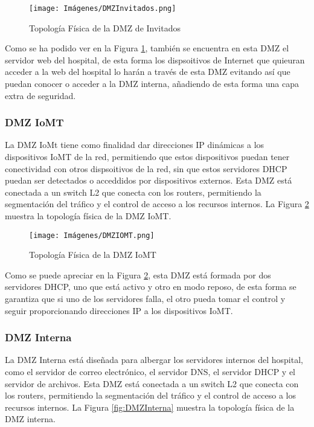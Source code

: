 \begin{figure}[H]
    \centering
    \texttt{[image: Imágenes/DMZInvitados.png]}
    \caption{Topología Física de la DMZ de Invitados}
    \label{fig:DMZInvitados}
\end{figure}

Como se ha podido ver en la Figura \ref{fig:DMZInvitados}, también se encuentra en esta DMZ el servidor web del hospital, de esta forma los dispsoitivos de Internet que quieuran acceder
a la web del hospital lo harán a través de esta DMZ evitando así que puedan conocer o acceder a la DMZ interna, añadiendo de esta forma una capa extra de seguridad.

\subsubsection{DMZ IoMT}
La DMZ IoMt tiene como finalidad dar direcciones IP dinámicas a los dispositivos IoMT de la red, permitiendo que estos dispositivos puedan tener conectividad con otros dispsoitivos de la red, sin 
que estos servidores DHCP puedan ser detectados o acceddidos por dispositivos externos. Esta DMZ está conectada a un switch L2 que conecta con los routers, permitiendo la segmentación del tráfico 
y el control de acceso a los recursos internos. La Figura \ref{fig:DMZIOMT} muestra la topología física de la DMZ IoMT.

\begin{figure}[H]
    \centering
    \texttt{[image: Imágenes/DMZIOMT.png]}
    \caption{Topología Física de la DMZ IoMT}
    \label{fig:DMZIOMT}
\end{figure}

Como se puede apreciar en la Figura \ref{fig:DMZIOMT}, esta DMZ está formada por dos servidores DHCP, uno que está activo y otro en modo reposo, de esta forma se garantiza que si uno de 
los servidores falla, el otro pueda tomar el control y seguir proporcionando direcciones IP a los dispositivos IoMT.

\subsubsection{DMZ Interna}
La DMZ Interna está diseñada para albergar los servidores internos del hospital, como el servidor de correo electrónico, el servidor DNS, el servidor DHCP y el servidor de archivos.
Esta DMZ está conectada a un switch L2 que conecta con los routers, permitiendo la segmentación del tráfico y el control de acceso a los recursos internos. La Figura \ref{fig:DMZInterna} 
muestra la topología física de la DMZ interna.

